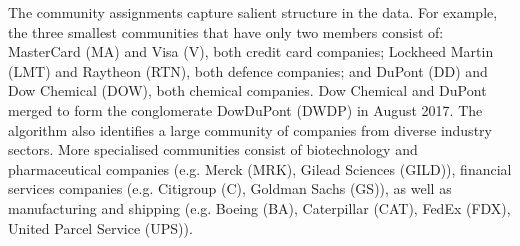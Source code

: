 \documentclass[onecolumn,pre,superscriptaddress, longbibliography, nofootinbib, notitlepage]{revtex4-1}
\begin{document}
The community assignments capture salient structure in the data. For example, the three smallest communities that have only two members consist of: MasterCard (MA) and Visa (V), both credit card companies; Lockheed Martin (LMT) and Raytheon (RTN), both defence companies; and DuPont (DD) and Dow Chemical (DOW), both chemical companies. Dow Chemical and DuPont merged to form the conglomerate DowDuPont (DWDP) in August 2017. The algorithm also identifies a large community of companies from diverse industry sectors.  More specialised communities consist of biotechnology and pharmaceutical companies (e.g. Merck (MRK), Gilead Sciences (GILD)), financial services companies (e.g. Citigroup (C), Goldman Sachs (GS)), as well as manufacturing and shipping (e.g. Boeing (BA), Caterpillar (CAT), FedEx (FDX), United Parcel Service (UPS)).
\end{document}
